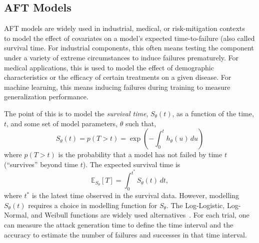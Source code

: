 \documentclass[conference]{IEEEtran}
\begin{document}
\subsection{AFT Models}
\label{survival_time}

AFT models are widely used in industrial, medical, or risk-mitigation contexts~\cite{kleinbaum1996survival, aft_models} to model the effect of covariates on a model's expected time-to-failure (also called survival time. For industrial components, this often means testing the component under a variety  of extreme circumstances to induce failures prematurely. For medical applications, this is used to model the effect of demographic characteristics or the efficacy of certain treatments on a given disease. For machine learning, this means inducing failures during training to measure generalization performance.

The point of this is to model the \textit{survival time}, $S_{\theta}(t)$, as a function of the time, $t$,  and some set of model parameters, $\theta$ such that,
$$
    S_{\theta}(t) = p(T>t) = \exp\left(-\int_0^t h_{\theta}(u) \, du\right)
$$
where $p(T>t)$ is the probability that a model has not failed by time $t$ (``survives'' beyond time $t$). The expected survival time is
\[
	\mathbb{E}_{S_\theta}[T] = \int_0^{t^*}  S_\theta(t) \,dt,
\]
where $t^*$ is the latest time observed in the survival data. However, modelling $S_{\theta}(t)$ requires a choice in modelling function for $S_{\theta}$. The Log-Logistic, Log-Normal, and Weibull functions are widely used alternatives~\cite{kleinbaum1996survival,meyers_aft}. For each trial, one can measure the attack generation time to define the time interval and the accuracy to estimate the number of failures and successes in that time interval. 
\end{document}
